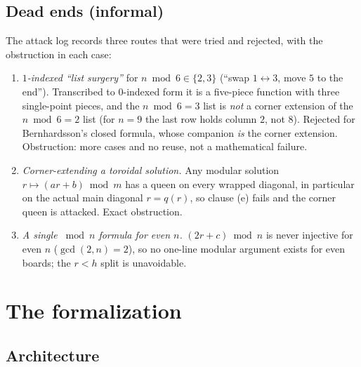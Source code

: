 \documentclass[11pt,a4paper]{article}
\theoremstyle{definition}
\theoremstyle{remark}
\begin{document}
\subsection{Dead ends (informal)}
\label{sec:deadends}

The attack log records three routes that were tried and rejected, with the obstruction in
each case:
\begin{enumerate}[nosep]
\item \emph{$1$-indexed ``list surgery''} for $n\bmod 6\in\{2,3\}$ (``swap $1\leftrightarrow 3$,
move $5$ to the end''). Transcribed to $0$-indexed form it is a five-piece function with
three single-point pieces, and the $n\bmod 6=3$ list is \emph{not} a corner extension of the
$n\bmod 6=2$ list (for $n=9$ the last row holds column $2$, not $8$). Rejected for
Bernhardsson's closed formula, whose companion \emph{is} the corner extension. Obstruction:
more cases and no reuse, not a mathematical failure.
\item \emph{Corner-extending a toroidal solution.} Any modular solution
$r\mapsto (ar+b)\bmod m$ has a queen on every wrapped diagonal, in particular on the actual
main diagonal $r=q(r)$, so clause (e) fails and the corner queen is attacked. Exact
obstruction.
\item \emph{A single $\bmod n$ formula for even $n$.} $(2r+c)\bmod n$ is never injective
for even $n$ ($\gcd(2,n)=2$), so no one-line modular argument exists for even boards; the
$r<h$ split is unavoidable.
\end{enumerate}

\section{The formalization}
\label{sec:formalization}

\subsection{Architecture}
\end{document}
